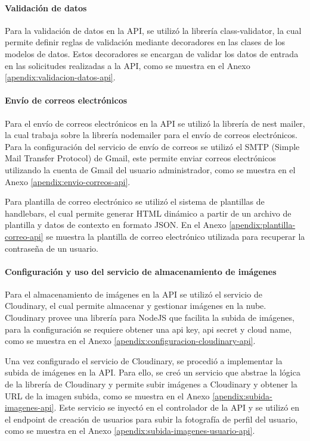 \paragraph{Validación de datos}
Para la validación de datos en la API, se utilizó la librería class-validator, la cual permite definir reglas de validación mediante
decoradores en las clases de los modelos de datos. Estos decoradores se encargan de validar los datos de entrada en las solicitudes
realizadas a la API, como se muestra en el Anexo \ref{apendix:validacion-datos-api}.

\paragraph{Envío de correos electrónicos}
Para el envío de correos electrónicos en la API se utilizó la librería de nest mailer, la cual trabaja sobre la librería nodemailer
para el envío de correos electrónicos. Para la configuración del servicio de envío de correos se utilizó el SMTP (Simple Mail Transfer
Protocol) de Gmail, este permite enviar correos electrónicos utilizando la cuenta de Gmail del usuario administrador, como se muestra
en el Anexo \ref{apendix:envio-correos-api}.
\bigbreak

Para plantilla de correo electrónico se utilizó el sistema de plantillas de handlebars, el cual permite generar HTML dinámico a partir
de un archivo de plantilla y datos de contexto en formato JSON. En el Anexo \ref{apendix:plantilla-correo-api} se muestra la plantilla
de correo electrónico utilizada para recuperar la contraseña de un usuario.

\paragraph{Configuración y uso del servicio de almacenamiento de imágenes}
Para el almacenamiento de imágenes en la API se utilizó el servicio de Cloudinary, el cual permite almacenar y gestionar imágenes en la nube.
Cloudinary provee una librería para NodeJS que facilita la subida de imágenes, para la configuración se requiere obtener una api key, api secret
y cloud name, como se muestra en el Anexo \ref{apendix:configuracion-cloudinary-api}.
\bigbreak

Una vez configurado el servicio de Cloudinary, se procedió a implementar la subida de imágenes en la API. Para ello, se creó un servicio
que abstrae la lógica de la librería de Cloudinary y permite subir imágenes a Cloudinary y obtener la URL de la imagen subida, como se
muestra en el Anexo \ref{apendix:subida-imagenes-api}. Este servicio se inyectó en el controlador de la API y se utilizó en el endpoint
de creación de usuarios para subir la fotografía de perfil del usuario, como se muestra en el Anexo \ref{apendix:subida-imagenes-usuario-api}.

